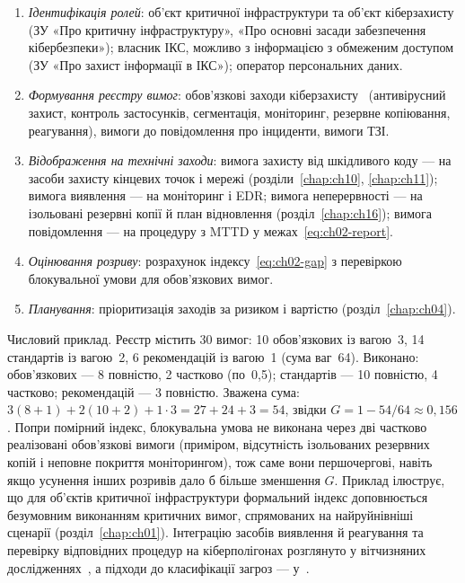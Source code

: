\begin{enumerate}
\item \emph{Ідентифікація ролей}: об'єкт критичної інфраструктури та об'єкт кіберзахисту (ЗУ «Про критичну інфраструктуру», «Про основні засади забезпечення кібербезпеки»); власник ІКС, можливо з інформацією з обмеженим доступом (ЗУ «Про захист інформації в ІКС»); оператор персональних даних.
\item \emph{Формування реєстру вимог}: обов'язкові заходи кіберзахисту~\cite{kmu-518,cip} (антивірусний захист, контроль застосунків, сегментація, моніторинг, резервне копіювання, реагування), вимоги до повідомлення про інциденти, вимоги ТЗІ.
\item \emph{Відображення на технічні заходи}: вимога захисту від шкідливого коду --- на засоби захисту кінцевих точок і мережі (розділи~\ref{chap:ch10}, \ref{chap:ch11}); вимога виявлення --- на моніторинг і EDR; вимога неперервності --- на ізольовані резервні копії й план відновлення (розділ~\ref{chap:ch16}); вимога повідомлення --- на процедуру з MTTD у межах~\eqref{eq:ch02-report}.
\item \emph{Оцінювання розриву}: розрахунок індексу~\eqref{eq:ch02-gap} з перевіркою блокувальної умови для обов'язкових вимог.
\item \emph{Планування}: пріоритизація заходів за ризиком і вартістю (розділ~\ref{chap:ch04}).
\end{enumerate}

Числовий приклад. Реєстр містить 30 вимог: 10 обов'язкових із вагою~3, 14 стандартів із вагою~2, 6 рекомендацій із вагою~1 (сума ваг~64). Виконано: обов'язкових --- 8 повністю, 2 частково (по~0,5); стандартів --- 10 повністю, 4 частково; рекомендацій --- 3 повністю. Зважена сума: $3(8{+}1){+}2(10{+}2){+}1\cdot3 = 27{+}24{+}3 = 54$, звідки $G = 1 - 54/64 \approx 0{,}156$. Попри помірний індекс, блокувальна умова не виконана через дві частково реалізовані обов'язкові вимоги (приміром, відсутність ізольованих резервних копій і неповне покриття моніторингом), тож саме вони першочергові, навіть якщо усунення інших розривів дало б більше зменшення $G$. Приклад ілюструє, що для об'єктів критичної інфраструктури формальний індекс доповнюється безумовним виконанням критичних вимог, спрямованих на найруйнівніші сценарії (розділ~\ref{chap:ch01}). Інтеграцію засобів виявлення й реагування та перевірку відповідних процедур на кіберполігонах розглянуто у вітчизняних дослідженнях~\cite{ch02:polotai-ids}, а підходи до класифікації загроз --- у~\cite{ch01:shevchenko}.

